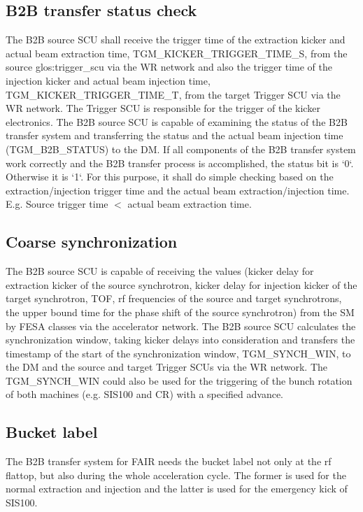 \subsection{B2B transfer status check}
The B2B source SCU shall receive the trigger time of the extraction kicker and actual beam extraction time, TGM\_KICKER\_TRIGGER\_TIME\_S, from the source \gls{glos:trigger_scu} via the WR network and also the trigger time of the injection kicker and actual beam injection time, TGM\_KICKER\_TRIGGER\_TIME\_T, from the target Trigger SCU via the WR network. The Trigger SCU is responsible for the trigger of the kicker electronics. The B2B source SCU is capable of examining the status of the B2B transfer system and transferring the status and the actual beam injection time  (TGM\_B2B\_STATUS) to the DM. If all components of the B2B transfer system work correctly and the B2B transfer process is accomplished, the status bit is `0`. Otherwise it is `1`. For this purpose, it shall do simple checking based on the extraction/injection trigger time and the actual beam extraction/injection time. E.g. Source trigger time $<$ actual beam extraction time.


\subsection{Coarse synchronization}

The B2B source SCU is capable of receiving the values (kicker delay for extraction kicker of the source synchrotron, kicker delay for injection kicker of the target synchrotron, TOF, rf frequencies of the source and target synchrotrons, the upper bound time for the phase shift of the source synchrotron) from the SM by FESA classes via the accelerator network. The B2B source SCU calculates the synchronization window, taking kicker delays into consideration and transfers the timestamp of the start of the synchronization window, TGM\_SYNCH\_WIN, to the DM and the source and target Trigger SCUs via the WR network. The TGM\_SYNCH\_WIN could also be used for the triggering of the bunch rotation of both machines (e.g. SIS100 and CR) with a specified advance. 

\subsection{Bucket label}
The B2B transfer system for FAIR needs the bucket label not only at the rf flattop, but also during the whole acceleration cycle. The former is used for the normal extraction and injection and the latter is used for the emergency kick of SIS100. 

